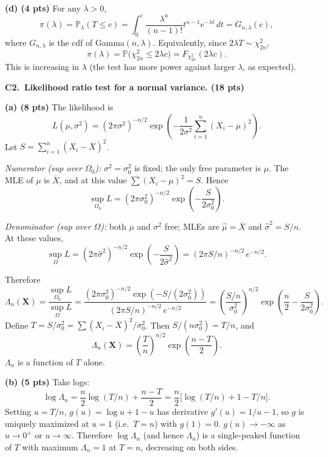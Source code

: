\documentclass[11pt]{article}
\begin{document}
\textbf{(d) (4 pts)} For any $\lambda > 0$,
\[
    \pi(\lambda) = \mathbb{P}_\lambda(T \le c) = \int_0^c \frac{\lambda^n}{(n-1)!} t^{n-1} e^{-\lambda t}\, dt = G_{n, \lambda}(c),
\]
where $G_{n, \lambda}$ is the cdf of Gamma$(n, \lambda)$. Equivalently, since $2\lambda T \sim \chi^2_{2n}$,
\[
    \pi(\lambda) = \mathbb{P}\bigl(\chi^2_{2n} \le 2\lambda c\bigr) = F_{\chi^2_{2n}}(2\lambda c).
\]
This is increasing in $\lambda$ (the test has more power against larger $\lambda$, as expected).

\vspace{0.6em}

\textbf{C2.\ Likelihood ratio test for a normal variance. (18 pts)}

\textbf{(a) (8 pts)} The likelihood is
\[
    L(\mu, \sigma^2) = (2\pi\sigma^2)^{-n/2}\exp\!\left(-\frac{1}{2\sigma^2}\sum_{i=1}^n (X_i - \mu)^2\right).
\]
Let $S = \sum_{i=1}^n (X_i - \overline{X})^2$.

\emph{Numerator (sup over $\Omega_0$):} $\sigma^2 = \sigma_0^2$ is fixed; the only free parameter is $\mu$. The MLE of $\mu$ is $\overline{X}$, and at this value $\sum(X_i - \mu)^2 = S$. Hence
\[
    \sup_{\Omega_0} L = (2\pi\sigma_0^2)^{-n/2}\exp\!\left(-\frac{S}{2\sigma_0^2}\right).
\]

\emph{Denominator (sup over $\Omega$):} both $\mu$ and $\sigma^2$ free; MLEs are $\widehat\mu = \overline{X}$ and $\widehat{\sigma}^2 = S/n$. At these values,
\[
    \sup_{\Omega} L = (2\pi\widehat{\sigma}^2)^{-n/2}\exp\!\left(-\frac{S}{2\widehat\sigma^2}\right) = (2\pi S/n)^{-n/2}\, e^{-n/2}.
\]

Therefore
\[
    \Lambda_n(\mathbf{X})
    = \frac{\sup_{\Omega_0} L}{\sup_{\Omega} L}
    = \frac{(2\pi\sigma_0^2)^{-n/2}\exp(-S/(2\sigma_0^2))}{(2\pi S/n)^{-n/2}\, e^{-n/2}}
    = \left(\frac{S/n}{\sigma_0^2}\right)^{\!n/2} \exp\!\left(\frac{n}{2} - \frac{S}{2\sigma_0^2}\right).
\]
Define $T = S/\sigma_0^2 = \sum (X_i - \overline{X})^2/\sigma_0^2$. Then $S/(n\sigma_0^2) = T/n$, and
\[
    \boxed{\;\Lambda_n(\mathbf{X}) = \left(\frac{T}{n}\right)^{\!n/2} \exp\!\left(\frac{n - T}{2}\right).\;}
\]
$\Lambda_n$ is a function of $T$ alone.

\textbf{(b) (5 pts)} Take logs:
\[
    \log \Lambda_n = \frac{n}{2}\log(T/n) + \frac{n - T}{2} = \frac{n}{2}\bigl[\log(T/n) + 1 - T/n\bigr].
\]
Setting $u = T/n$, $g(u) = \log u + 1 - u$ has derivative $g'(u) = 1/u - 1$, so $g$ is uniquely maximized at $u = 1$ (i.e.\ $T = n$) with $g(1) = 0$. $g(u) \to -\infty$ as $u \to 0^+$ or $u \to \infty$. Therefore $\log \Lambda_n$ (and hence $\Lambda_n$) is a single-peaked function of $T$ with maximum $\Lambda_n = 1$ at $T = n$, decreasing on both sides.
\end{document}
